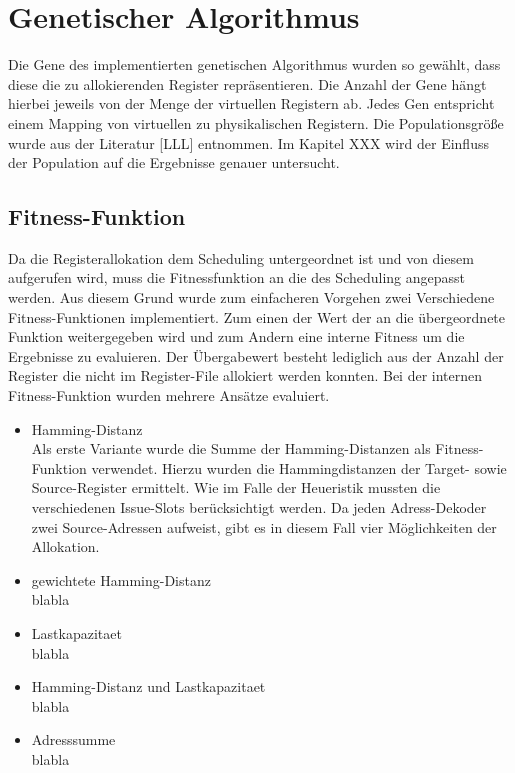 \section{Genetischer Algorithmus}
\label{sec:genetischerAlgorithmus}
Die Gene des implementierten genetischen Algorithmus wurden so gewählt, dass diese die zu allokierenden Register repräsentieren. Die Anzahl der Gene hängt hierbei jeweils von der Menge der virtuellen Registern ab. Jedes Gen entspricht einem Mapping von virtuellen zu physikalischen Registern.
Die Populationsgröße wurde aus der Literatur [LLL] entnommen. Im Kapitel XXX wird der Einfluss der Population auf die Ergebnisse genauer untersucht. 


\subsection{Fitness-Funktion}
Da die Registerallokation dem Scheduling untergeordnet ist und von diesem aufgerufen wird, muss die Fitnessfunktion an die des Scheduling angepasst werden. Aus diesem Grund wurde zum einfacheren Vorgehen zwei Verschiedene Fitness-Funktionen implementiert. Zum einen der Wert der an die übergeordnete Funktion weitergegeben wird und zum Andern eine interne Fitness um die Ergebnisse zu evaluieren.
Der Übergabewert besteht lediglich aus der Anzahl der Register die nicht im Register-File allokiert werden konnten. Bei der internen Fitness-Funktion wurden mehrere Ansätze evaluiert.
\begin{itemize}
	\item Hamming-Distanz\\
		Als erste Variante wurde die Summe der Hamming-Distanzen als Fitness-Funktion verwendet. Hierzu wurden die Hammingdistanzen der Target- sowie Source-Register ermittelt. Wie im Falle der Heueristik mussten die verschiedenen Issue-Slots berücksichtigt werden. Da jeden Adress-Dekoder zwei Source-Adressen aufweist, gibt es in diesem Fall vier Möglichkeiten der Allokation.
	\item gewichtete Hamming-Distanz\\
		blabla
	\item Lastkapazitaet\\
		blabla
	\item Hamming-Distanz und Lastkapazitaet\\
		blabla
	\item Adresssumme\\
		blabla
\end{itemize}
 
